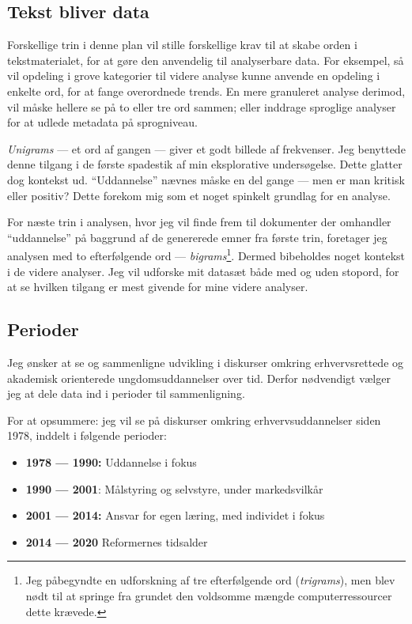 \subsection{Tekst bliver data}

Forskellige trin i denne plan vil stille forskellige krav til at skabe orden i tekstmaterialet, for at gøre den anvendelig til analyserbare data.
For eksempel, så vil opdeling i grove kategorier til videre analyse kunne anvende en opdeling i enkelte ord, for at fange overordnede trends.
En mere granuleret analyse derimod, vil måske hellere se på to eller tre ord sammen; eller inddrage sproglige analyser for at udlede metadata på sprogniveau.

\textit{Unigrams} — et ord af gangen — giver et godt billede af frekvenser.
Jeg benyttede  denne tilgang i de første spadestik af min eksplorative undersøgelse.
Dette glatter dog kontekst ud.
“Uddannelse” nævnes måske en del gange — men er man kritisk eller positiv?
Dette forekom mig som et noget spinkelt grundlag for en analyse.

For næste trin i analysen, hvor jeg vil finde frem til dokumenter der omhandler “uddannelse” på baggrund af de genererede emner fra første trin, foretager jeg analysen med to efterfølgende ord — \textit{bigrams}\footnote{Jeg påbegyndte en udforskning af tre efterfølgende ord (\textit{trigrams}), men blev nødt til at springe fra grundet den voldsomme mængde computerressourcer dette krævede.}.
Dermed bibeholdes noget kontekst i de videre analyser.
Jeg vil udforske mit datasæt både med og uden stopord, for at se hvilken tilgang er mest givende for mine videre analyser.

\subsection{Perioder}\label{sec:periods}
Jeg ønsker at se og sammenligne udvikling i diskurser omkring erhvervsrettede og akademisk orienterede ungdomsuddannelser over tid.
Derfor nødvendigt vælger jeg at dele data ind i perioder til sammenligning.

For at opsummere: jeg vil se på diskurser omkring erhvervsuddannelser siden 1978, inddelt i følgende perioder:

\begin{itemize}
  \item
    \textbf{1978 — 1990:} Uddannelse i fokus
  \item
    \textbf{1990 — 2001}: Målstyring og selvstyre, under markedsvilkår
  \item
    \textbf{2001 — 2014:} Ansvar for egen læring, med individet i fokus
  \item
    \textbf{2014 — 2020} Reformernes tidsalder
\end{itemize}


